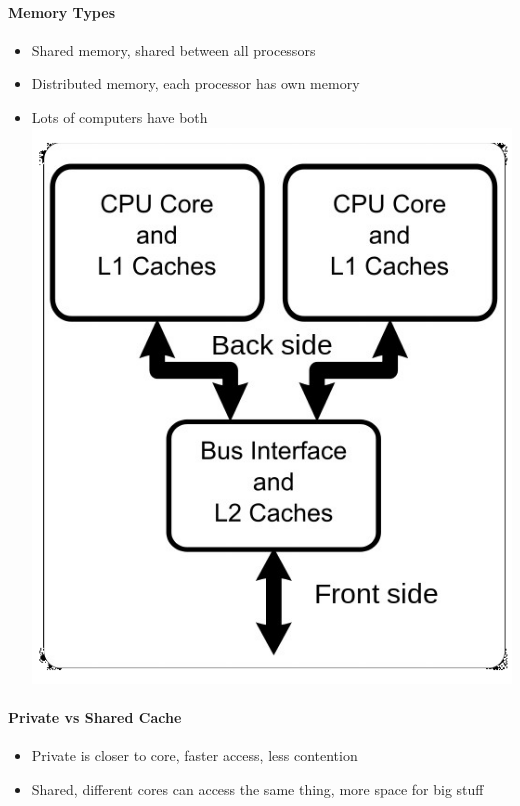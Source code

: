 \documentclass[12 pt]{article}
\begin{document}
\paragraph{Memory Types}
\begin{itemize}
\item Shared memory, shared between all processors
\item Distributed memory, each processor has own memory
\item Lots of computers have both
\includegraphics[scale=0.3]{mts}
\end{itemize}
\paragraph{Private vs Shared Cache}
\begin{itemize}
\item Private is closer to core, faster access, less contention
\item Shared, different cores can access the same thing, more space for big stuff
\end{itemize}
\end{document}
